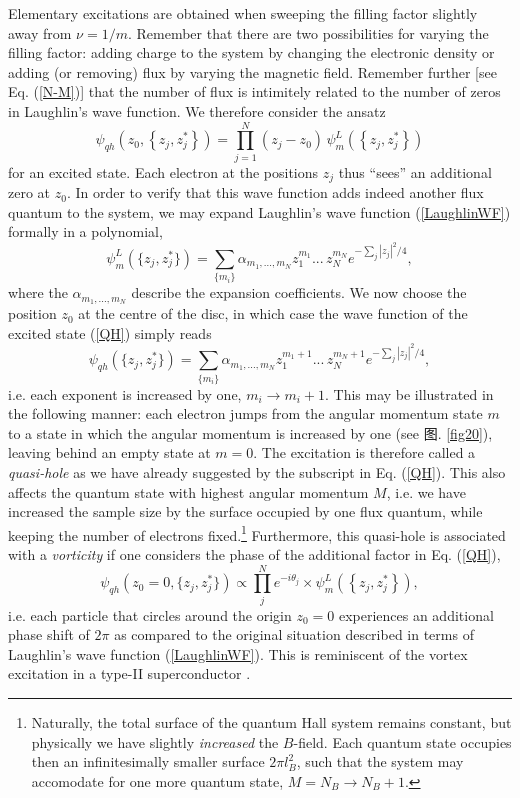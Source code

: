 \documentclass[10pt]{book}
\newcommand{\beq}{\begin{equation}}
\newcommand{\eeq}{\end{equation}}
\begin{document}
Elementary excitations are obtained when sweeping the filling factor 
slightly away from $\nu=1/m$. Remember that there are two possibilities
for varying the filling factor: adding charge to the system by changing the electronic density or adding (or removing) flux by
varying the magnetic field. Remember further [see Eq. (\ref{N-M})] that the number of flux is intimitely related to the number
of zeros in Laughlin's wave function. We therefore consider the ansatz
\beq\label{QH}
\psi_{qh}\left(z_0,\left\{z_j,z_j^*\right\}\right)=\prod_{j=1}^N (z_j - z_0)\,\psi_m^L\left(\left\{z_j,z_j^*\right\}\right)
\eeq
for an excited state.
Each electron at the positions $z_j$ thus ``sees'' an additional zero at $z_0$. In order to verify that 
this wave function adds indeed another flux quantum to the system, we may expand Laughlin's wave function (\ref{LaughlinWF}) 
formally in a polynomial,
$$\psi_m^L(\{z_j,z_j^*\})=\sum_{\{m_i\}} \alpha_{m_1, ...,m_N}z_1^{m_1}...\, z_N^{m_N}
e^{-\sum_j|z_j|^2/4},$$
where the $\alpha_{m_1, ...,m_N}$ describe the expansion coefficients. We now choose the position $z_0$ at the centre of
the disc, in which case the wave function of the excited state (\ref{QH}) simply reads
$$\psi_{qh}(\{z_j,z_j^*\})=\sum_{\{m_i\}} \alpha_{m_1, ...,m_N}z_1^{m_1+1}...\, z_N^{m_N+1}
e^{-\sum_j|z_j|^2/4},$$
i.e. each exponent is increased by one, $m_i\to m_i+1$. This may be illustrated in the following manner: each electron%
jumps from the
angular momentum state $m$ to a state in which the angular momentum is increased by one (see 图. \ref{fig20}), leaving behind
an empty state at $m=0$. The excitation is therefore called a {\sl quasi-hole} as we have already suggested by the subscript in
Eq. (\ref{QH}). This also affects the quantum state with highest angular momentum $M$, i.e. we have increased the sample
size by the surface occupied by one flux quantum, while keeping the number of electrons fixed.\footnote{Naturally, the total
surface of the quantum Hall system remains constant, but physically we have slightly {\sl increased} the $B$-field. Each
quantum state occupies then an infinitesimally smaller surface $2\pi l_B^2$, such that the system may accomodate for one more quantum state, $M=N_B\to N_B+1$.} 
Furthermore, this quasi-hole
is associated with a {\sl vorticity} if one considers the phase of the additional factor in Eq. (\ref{QH}),
$$\psi_{qh}(z_0 = 0,\{z_j,z_j^*\})\propto \prod_{j}^N e^{-i\theta_j}\times \psi_m^L\left(\left\{z_j,z_j^*\right\}\right),
$$
i.e. each particle that circles around the origin $z_0=0$ experiences an additional phase shift of $2\pi$ as compared
to the original situation described in terms of Laughlin's wave function (\ref{LaughlinWF}). This is 
reminiscent of the vortex excitation in a type-II superconductor \cite{tinkham}.
\end{document}
